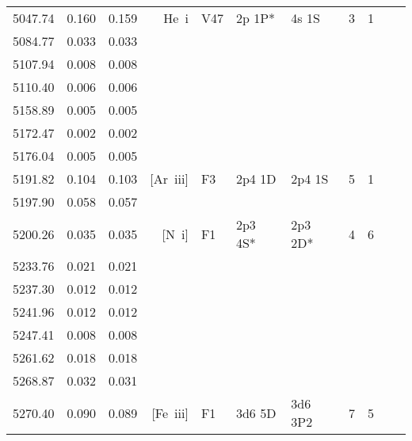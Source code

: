 \begin{longtable}{lrlrlllllll}
 5047.74 &   0.160 &   0.159 &  He~{\sc i}      &  V47       &  2p 1P*    &  4s 1S     &          3 &        1    \\
 5084.77 &   0.033 &   0.033                                                                                      \\
 5107.94 &   0.008 &   0.008                                                                                      \\
 5110.40 &   0.006 &   0.006                                                                                      \\
 5158.89 &   0.005 &   0.005                                                                                      \\
 5172.47 &   0.002 &   0.002                                                                                      \\
 5176.04 &   0.005 &   0.005                                                                                      \\
 5191.82 &   0.104 &   0.103 &  [Ar~{\sc iii}]  &  F3        &  2p4 1D    &  2p4 1S    &          5 &        1    \\
 5197.90 &   0.058 &   0.057                                                                                      \\
 5200.26 &   0.035 &   0.035 &  [N~{\sc i}]     &  F1        &  2p3 4S*   &  2p3 2D*   &          4 &        6    \\
 5233.76 &   0.021 &   0.021                                                                                      \\
 5237.30 &   0.012 &   0.012                                                                                      \\
 5241.96 &   0.012 &   0.012                                                                                      \\
 5247.41 &   0.008 &   0.008                                                                                      \\
 5261.62 &   0.018 &   0.018                                                                                      \\
 5268.87 &   0.032 &   0.031                                                                                      \\
 5270.40 &   0.090 &   0.089 &  [Fe~{\sc iii}]  &  F1        &  3d6 5D    &  3d6 3P2   &          7 &        5    \\

\end{longtable}
